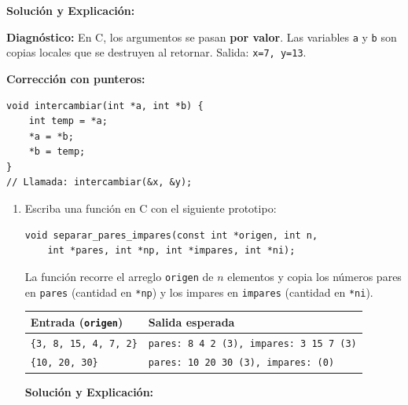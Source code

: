 \documentclass[11pt,letterpaper]{article}
\begin{document}
\begin{enumerate}[label=\textbf{\arabic*.}]
\begin{enumerate}[label=(\alph*)]
        \begin{solucionbox}
        \textbf{Solución y Explicación:}

        \noindent \textbf{Diagnóstico:} En C, los argumentos se pasan \textbf{por valor}. Las variables \texttt{a} y \texttt{b} son copias locales que se destruyen al retornar. Salida: \texttt{x=7, y=13}.

        \noindent \textbf{Corrección con punteros:}
        \begin{lstlisting}[style=customc]
void intercambiar(int *a, int *b) {
    int temp = *a;
    *a = *b;
    *b = temp;
}
// Llamada: intercambiar(&x, &y);
        \end{lstlisting}
        \end{solucionbox}
    \end{enumerate}

    \newpage
    \begin{enumerate}[label=(\alph*), resume]
        \item Escriba una función en C con el siguiente prototipo:
        \begin{lstlisting}[style=customc, numbers=none]
void separar_pares_impares(const int *origen, int n,
    int *pares, int *np, int *impares, int *ni);
        \end{lstlisting}
        La función recorre el arreglo \texttt{origen} de $n$ elementos y copia los números pares en \texttt{pares} (cantidad en \texttt{*np}) y los impares en \texttt{impares} (cantidad en \texttt{*ni}).

        \begin{center}
        \begin{tabular}{ll}
        \toprule
        \textbf{Entrada (\texttt{origen})} & \textbf{Salida esperada} \\
        \midrule
        \texttt{\{3, 8, 15, 4, 7, 2\}} & \texttt{pares: 8 4 2 (3), impares: 3 15 7 (3)} \\
        \texttt{\{10, 20, 30\}} & \texttt{pares: 10 20 30 (3), impares: (0)} \\
        \bottomrule
        \end{tabular}
        \end{center}

        \begin{solucionbox}
        \textbf{Solución y Explicación:}


\end{solucionbox}
\end{enumerate}
\end{enumerate}
\end{document}
